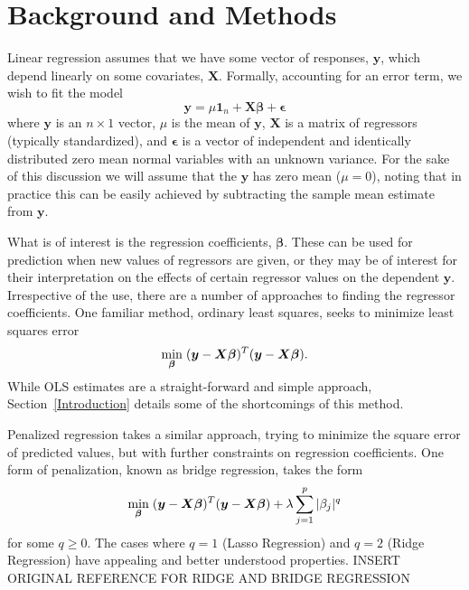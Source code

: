 \documentclass{uwstat572}
\begin{document}
\section{Background and Methods}
Linear regression assumes that we have some vector of responses, $\boldsymbol{y}$, which depend linearly on some covariates, $\boldsymbol{X}$. Formally, accounting for an error term, we wish to fit the model \[
\boldsymbol{y} = \mu \boldsymbol{1}_n + \boldsymbol{X}\boldsymbol{\beta}+\boldsymbol{\epsilon}
\] where $\boldsymbol{y}$ is an $n \times 1$ vector, $\mu$ is the mean of $\boldsymbol{y}$, $\boldsymbol{X}$ is a matrix of regressors (typically standardized), and $\boldsymbol{\epsilon}$ is a vector of independent and identically distributed zero mean normal variables with an unknown variance. For the sake of this discussion we will assume that the $\boldsymbol{y}$ has zero mean ($\mu=0$), noting that in practice this can be easily achieved by subtracting the sample mean estimate from $\mathbf{y}$.

What is of interest is the regression coefficients, $\boldsymbol{\beta}$. These can be used for prediction when new values of regressors are given, or they may be of interest for their interpretation on the effects of certain regressor values on the dependent $\boldsymbol{y}$. Irrespective of the use, there are a number of approaches to finding the regressor coefficients. One familiar method, ordinary least squares, seeks to minimize least squares error\[
\min_{\boldsymbol{\beta}} \hspace{.1cm} (\boldsymbol{y}-\boldsymbol{X}\boldsymbol{\beta})^T(\boldsymbol{y}-\boldsymbol{X}\boldsymbol{\beta}).
\] While OLS estimates are a straight-forward and simple approach, Section~\ref{Introduction} details some of the shortcomings of this method.

Penalized regression takes a similar approach, trying to minimize the square error of predicted values, but with further constraints on regression coefficients. One form of penalization, known as bridge regression, takes the form  \[
\min_{\boldsymbol{\beta}}  \hspace{.1cm} (\boldsymbol{y}-\boldsymbol{X}\boldsymbol{\beta})^T(\boldsymbol{y}-\boldsymbol{X}\boldsymbol{\beta})+\lambda\sum_{j=1}^p|\beta_j|^q
\] for some $q\geq0$. The cases where $q=1$ (Lasso Regression) and $q=2$ (Ridge Regression) have appealing and better understood properties. INSERT ORIGINAL REFERENCE FOR RIDGE AND BRIDGE REGRESSION
\end{document}
